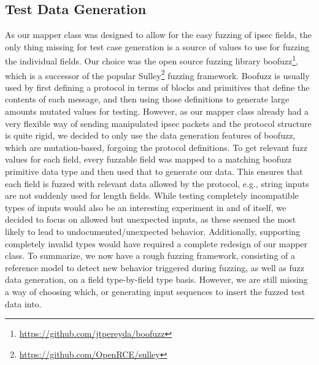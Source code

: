 \subsection{Test Data Generation} \label{subsec:data_gen}
As our mapper class was designed to allow for the easy fuzzing of \ac{ipsec} fields, the only thing missing for test case generation is a source of values to use for fuzzing the individual fields. Our choice was the open source fuzzing library boofuzz\footnote{\url{https://github.com/jtpereyda/boofuzz}}, which is a successor of the popular Sulley\footnote{\url{https://github.com/OpenRCE/sulley}} fuzzing framework. Boofuzz is usually used by first defining a protocol in terms of blocks and primitives that define the contents of each message, and then using those definitions to generate large amounts mutated values for testing. However, as our mapper class already had a very flexible way of sending manipulated \ac{ipsec} packets and the protocol structure is quite rigid, we decided to only use the data generation features of boofuzz, which are mutation-based, forgoing the protocol definitions. To get relevant fuzz values for each field, every fuzzable field was mapped to a matching boofuzz primitive data type and then used that to generate our data. This ensures that each field is fuzzed with relevant data allowed by the protocol, e.g., string inputs are not suddenly used for length fields. While testing completely incompatible types of inputs would also be an interesting experiment in and of itself, we decided to focus on allowed but unexpected inputs, as these seemed the most likely to lead to undocumented/unexpected behavior. Additionally, supporting completely invalid types would have required a complete redesign of our mapper class. To summarize, we now have a rough fuzzing framework, consisting of a reference model to detect new behavior triggered during fuzzing, as well as fuzz data generation, on a field type-by-field type basis. However, we are still missing a way of choosing which, or generating input sequences to insert the fuzzed test data into. 


